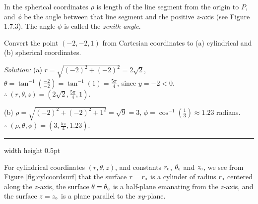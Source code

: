 In the spherical coordinates
$\rho$ is length of the line segment from the origin to $P$, 
and $\phi$ be the angle between that line segment
and the positive $z$-axis (see Figure 1.7.3).
The angle $\phi$ is called the \emph{zenith angle}. 

\begin{exmp}
 Convert the point $(-2,-2,1)$ from Cartesian coordinates to (a) cylindrical and (b) spherical
 coordinates.\smallskip
 \par\noindent\emph{Solution:} (a) $r = \sqrt{(-2)^2 + (-2)^2} = 2\sqrt{2}$, $\theta =
 \tan^{-1} \left( \frac{-2}{-2} \right) = \tan^{-1}(1) = \frac{5 \pi}{4}$, since $y = -2 < 0$.\\
 $\therefore ~ (r,\theta,z) = \left( 2\sqrt{2},\frac{5 \pi}{4},1 \right)$.\smallskip
 \par\noindent (b) $\rho = \sqrt{(-2)^2 + (-2)^2 + 1^2} = \sqrt{9} = 3$, $\phi = \cos^{-1} \left( \frac{1}{3} \right)
 \approx 1.23$ radians.\\
 $\therefore ~ (\rho,\theta,\phi) = \left( 3,\frac{5 \pi}{4}, 1.23 \right)$.
 \end{exmp}
\hrule width \textwidth height 0.5pt
\smallskip

For cylindrical coordinates $(r,\theta,z)$, and constants $r_{\scriptscriptstyle 0}$, $\theta_{\scriptscriptstyle 0}$ and $z_{\scriptscriptstyle 0}$, we see
from Figure \ref{fig:cylcoordsurf}
that the surface $r = r_{\scriptscriptstyle 0}$ is a cylinder of radius $r_{\scriptscriptstyle 0}$ centered along the $z$-axis, the surface
$\theta = \theta_{\scriptscriptstyle 0}$ is a half-plane emanating from the $z$-axis, and the surface $z = z_{\scriptscriptstyle 0}$ is a plane
parallel to the $xy$-plane.

